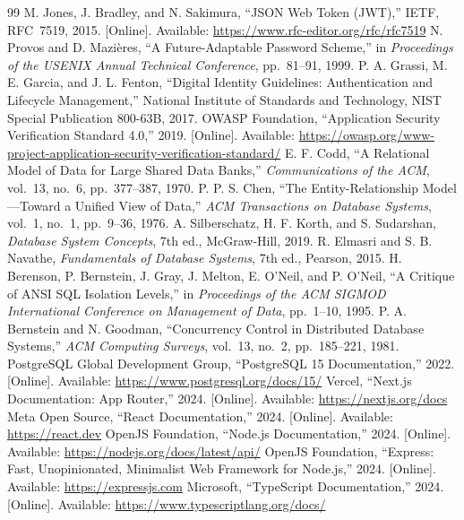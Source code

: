 \begin{thebibliography}{99}
 M. Jones, J. Bradley, and N. Sakimura, ``{JSON} {Web} {Token} ({JWT}),'' IETF, RFC~7519, 2015. [Online]. Available: \url{https://www.rfc-editor.org/rfc/rfc7519}
 N. Provos and D. Mazi{\`e}res, ``A Future-Adaptable Password Scheme,'' in \textit{Proceedings of the USENIX Annual Technical Conference}, pp.~81--91, 1999.
 P. A. Grassi, M. E. Garcia, and J. L. Fenton, ``Digital Identity Guidelines: Authentication and Lifecycle Management,'' National Institute of Standards and Technology, NIST Special Publication 800-63B, 2017.
 OWASP Foundation, ``Application Security Verification Standard 4.0,'' 2019. [Online]. Available: \url{https://owasp.org/www-project-application-security-verification-standard/}
 E. F. Codd, ``A Relational Model of Data for Large Shared Data Banks,'' \textit{Communications of the ACM}, vol.~13, no.~6, pp.~377--387, 1970.
 P. P. S. Chen, ``The Entity-Relationship Model---Toward a Unified View of Data,'' \textit{ACM Transactions on Database Systems}, vol.~1, no.~1, pp.~9--36, 1976.
 A. Silberschatz, H. F. Korth, and S. Sudarshan, \textit{Database System Concepts}, 7th ed., McGraw-Hill, 2019.
 R. Elmasri and S. B. Navathe, \textit{Fundamentals of Database Systems}, 7th ed., Pearson, 2015.
 H. Berenson, P. Bernstein, J. Gray, J. Melton, E. O'Neil, and P. O'Neil, ``A Critique of {ANSI} {SQL} Isolation Levels,'' in \textit{Proceedings of the ACM SIGMOD International Conference on Management of Data}, pp.~1--10, 1995.
 P. A. Bernstein and N. Goodman, ``Concurrency Control in Distributed Database Systems,'' \textit{ACM Computing Surveys}, vol.~13, no.~2, pp.~185--221, 1981.
 PostgreSQL Global Development Group, ``{PostgreSQL} 15 Documentation,'' 2022. [Online]. Available: \url{https://www.postgresql.org/docs/15/}
 Vercel, ``Next.js Documentation: App Router,'' 2024. [Online]. Available: \url{https://nextjs.org/docs}
 Meta Open Source, ``React Documentation,'' 2024. [Online]. Available: \url{https://react.dev}
 OpenJS Foundation, ``Node.js Documentation,'' 2024. [Online]. Available: \url{https://nodejs.org/docs/latest/api/}
 OpenJS Foundation, ``Express: Fast, Unopinionated, Minimalist Web Framework for {Node.js},'' 2024. [Online]. Available: \url{https://expressjs.com}
 Microsoft, ``{TypeScript} Documentation,'' 2024. [Online]. Available: \url{https://www.typescriptlang.org/docs/}

\end{thebibliography}
